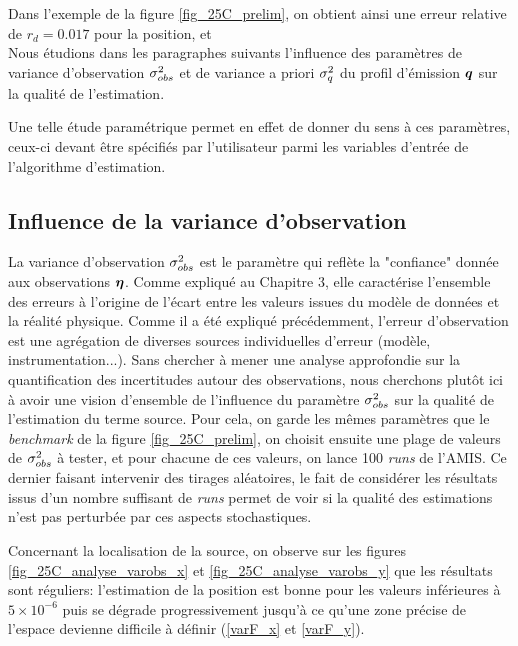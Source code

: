 
 Dans l'exemple de la figure \ref{fig_25C_prelim}, on obtient ainsi une erreur relative de $r_d = 0.017$ pour la position, et \\
 
 Nous étudions dans les paragraphes suivants l'influence des paramètres de variance d'observation ${\sigma_{obs}^2}$ et de variance a priori $\sigma_q^2$ du profil d'émission ${\bm{q}}$ sur la qualité de l'estimation.
 
 \newpage
 
  Une telle étude paramétrique permet en effet de donner du sens à ces paramètres, ceux-ci devant être spécifiés par l'utilisateur parmi les variables d'entrée de l'algorithme d'estimation. 
 
 \subsection{Influence de la variance d'observation}
 
 La variance d'observation ${\sigma_{obs}^2}$ est le paramètre qui reflète la "confiance" donnée aux observations ${\bm{\eta}}$. Comme expliqué au Chapitre 3, elle caractérise l'ensemble des erreurs à l'origine de l'écart entre les valeurs issues du modèle de données et la réalité physique. Comme il a été expliqué précédemment, l'erreur d'observation est une agrégation de diverses sources individuelles d'erreur (modèle, instrumentation...). Sans chercher à mener une analyse approfondie sur la quantification des incertitudes autour des observations, nous cherchons plutôt ici à avoir une vision d'ensemble de l'influence du paramètre ${\sigma_{obs}^2}$ sur la qualité de l'estimation du terme source. Pour cela, on garde les mêmes paramètres que le \textit{benchmark} de la figure \ref{fig_25C_prelim}, on choisit ensuite une plage de valeurs de ${\sigma_{obs}^2}$ à tester, et pour chacune de ces valeurs, on lance 100 \textit{runs} de l'AMIS. Ce dernier faisant intervenir des tirages aléatoires, le fait de considérer les résultats issus d'un nombre suffisant de \textit{runs} permet de voir si la qualité des estimations n'est pas perturbée par ces aspects stochastiques. 
   
         Concernant la localisation de la source, on observe sur les figures \ref{fig_25C_analyse_varobs_x} et \ref{fig_25C_analyse_varobs_y} que les résultats sont réguliers: l'estimation de la position est bonne pour les valeurs inférieures à $5\times 10^{-6}$ puis se dégrade progressivement jusqu'à {ce qu'une zone précise de l'espace devienne difficile à définir} (\ref{varF_x} et \ref{varF_y}).
         
